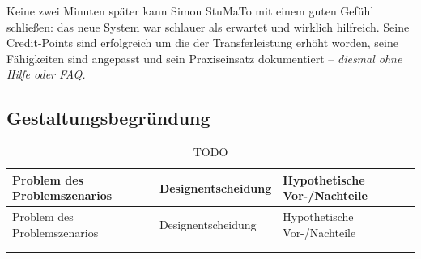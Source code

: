 \documentclass[
  12pt,
  ngerman,
  a4paper,
]{article}
\begin{document}
Keine zwei Minuten später kann Simon StuMaTo mit einem guten Gefühl
schließen: das neue System war schlauer als erwartet und wirklich
hilfreich. Seine Credit-Points sind erfolgreich um die der
Transferleistung erhöht worden, seine Fähigkeiten sind angepasst und
sein Praxiseinsatz dokumentiert -- \emph{diesmal ohne Hilfe oder FAQ.}

\hypertarget{gestaltungsbegruxfcndung}{%
\subsection{Gestaltungsbegründung}\label{gestaltungsbegruxfcndung}}

\begin{longtable}[]{@{}lll@{}}
\caption{TODO \label{tbl:claims:activity}}\tabularnewline
\toprule
\begin{minipage}[b]{0.35\columnwidth}\raggedright
Problem des Problemszenarios\strut
\end{minipage} & \begin{minipage}[b]{0.22\columnwidth}\raggedright
Designentscheidung\strut
\end{minipage} & \begin{minipage}[b]{0.35\columnwidth}\raggedright
Hypothetische Vor-/Nachteile\strut
\end{minipage}\tabularnewline
\midrule
\endfirsthead
\toprule
\begin{minipage}[b]{0.35\columnwidth}\raggedright
Problem des Problemszenarios\strut
\end{minipage} & \begin{minipage}[b]{0.22\columnwidth}\raggedright
Designentscheidung\strut
\end{minipage} & \begin{minipage}[b]{0.35\columnwidth}\raggedright
Hypothetische Vor-/Nachteile\strut
\end{minipage}\tabularnewline
\midrule
\endhead
\begin{minipage}[t]{0.35\columnwidth}\raggedright
\strut
\end{minipage} & \begin{minipage}[t]{0.22\columnwidth}\raggedright
\strut
\end{minipage} & \begin{minipage}[t]{0.35\columnwidth}\raggedright
\strut
\end{minipage}\tabularnewline
\begin{minipage}[t]{0.35\columnwidth}\raggedright
\strut
\end{minipage} & \begin{minipage}[t]{0.22\columnwidth}\raggedright

\end{minipage}
\end{longtable}
\end{document}

